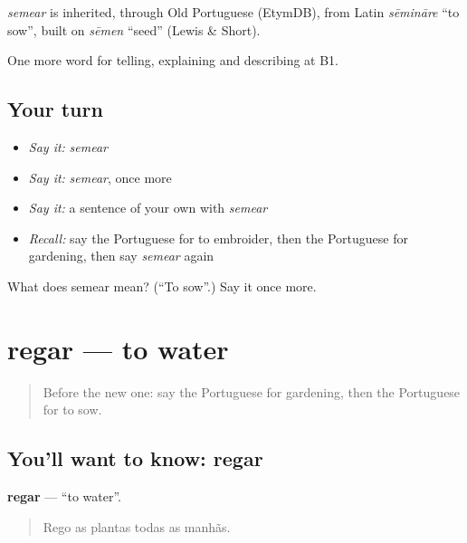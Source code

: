 \begin{cousinweb}
\emph{semear} is inherited, through Old Portuguese (EtymDB), from Latin \emph{sēmināre} \textquotedblleft{}to sow\textquotedblright{}, built on \emph{sēmen} \textquotedblleft{}seed\textquotedblright{} (Lewis \& Short).
\end{cousinweb}

\begin{grammarlens}[title={What you've built}]
One more word for telling, explaining and describing at B1.
\end{grammarlens}

\subsection*{Your turn}
\begin{itemize}
\raggedright
  \item \emph{Say it:} \emph{semear}
  \item \emph{Say it:} \emph{semear}, once more
  \item \emph{Say it:} a sentence of your own with \emph{semear}
  \item \emph{Recall:} say the Portuguese for to embroider, then the Portuguese for gardening, then say \emph{semear} again
\end{itemize}

\begin{tcolorbox}[breakable,colback=teal!4,colframe=teal!35!black,title={Before you move on}]
What does semear mean? (\textquotedblleft{}To sow\textquotedblright{}.) Say it once more.
\end{tcolorbox}
\section[regar]{regar — to water}

\label{lesson:PT-C501-regar}



\begin{quote}
Before the new one: say the Portuguese for gardening, then the Portuguese for to sow.
\end{quote}

\subsection*{You'll want to know: regar}
\textbf{regar} — \textquotedblleft{}to water\textquotedblright{}.

\begin{quote}
Rego as plantas todas as manhãs.
\end{quote}

